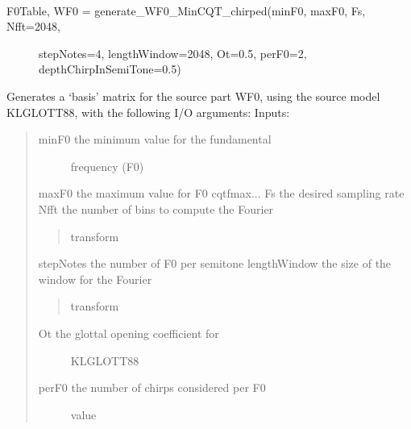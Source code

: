 \documentclass[letterpaper,10pt,english]{sphinxmanual}
\begin{document}
\begin{fulllineitems}
\label{reference/separateleadfunctions:pyfasst.SeparateLeadStereo.separateLeadFunctions.generate_WF0_NSGTMinQT_chirped}~\begin{description}
\item[{F0Table, WF0 = generate\_WF0\_MinCQT\_chirped(minF0, maxF0, Fs, Nfft=2048,}] \leavevmode
stepNotes=4, lengthWindow=2048,
Ot=0.5, perF0=2,
depthChirpInSemiTone=0.5)

\end{description}

Generates a `basis' matrix for the source part WF0, using the
source model KLGLOTT88, with the following I/O arguments:
Inputs:
\begin{quote}
\begin{description}
\item[{minF0                the minimum value for the fundamental}] \leavevmode
frequency (F0)

\end{description}

maxF0                the maximum value for F0
cqtfmax...
Fs                   the desired sampling rate
Nfft                 the number of bins to compute the Fourier
\begin{quote}

transform
\end{quote}

stepNotes            the number of F0 per semitone
lengthWindow         the size of the window for the Fourier
\begin{quote}

transform
\end{quote}
\begin{description}
\item[{Ot                   the glottal opening coefficient for}] \leavevmode
KLGLOTT88

\item[{perF0                the number of chirps considered per F0}] \leavevmode
value


\end{description}
\end{quote}
\end{fulllineitems}
\end{document}
